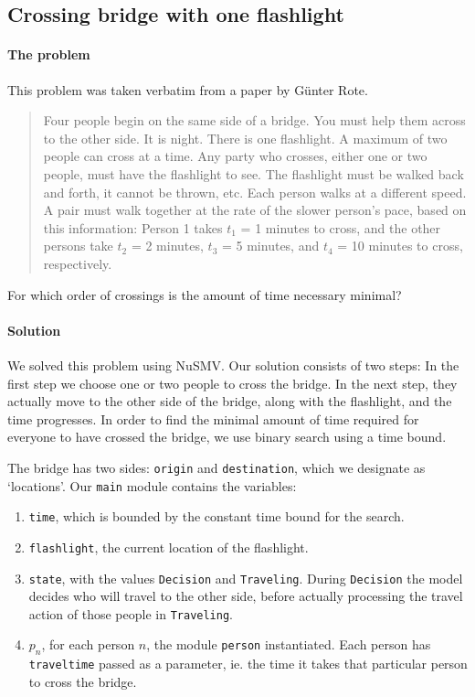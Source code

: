\documentclass[12pt]{article}
\begin{document}
\subsection*{Crossing bridge with one flashlight}
\paragraph{The problem}

This problem was taken verbatim from a paper by G\"unter Rote. \cite{rote2002crossing}

\begin{quotation}
Four people begin on the same side of a bridge.
You must help them across to the other side.
It is night.
There is one flashlight.
A maximum of two people can cross at a time.
Any party who crosses, either one or two people, must have the flashlight to see.
The flashlight must be walked back and forth, it cannot be thrown, etc.
Each person walks at a different speed.
A pair must walk together at the rate of the slower person's pace, based on this information:
Person 1 takes $t_1$ = 1 minutes to cross, and the other persons take $t_2$ = 2
minutes, $t_3$ = 5 minutes, and $t_4$ = 10 minutes to cross, respectively.
\end{quotation}

For which order of crossings is the amount of time necessary minimal?

\paragraph{Solution}
We solved this problem using NuSMV.
Our solution consists of two steps:
In the first step we choose one or two people to cross the bridge.
In the next step, they actually move to the other side of the bridge, along with the flashlight, and the time progresses.
In order to find the minimal amount of time required for everyone to have crossed the bridge, we use binary search using a time bound.

The bridge has two sides: \texttt{origin} and \texttt{destination}, which we designate as `locations'.
Our \texttt{main} module contains the variables:
\begin{enumerate}
\item \texttt{time}, which is bounded by the constant time bound for the search.
\item \texttt{flashlight}, the current location of the flashlight.
\item \texttt{state}, with the values \texttt{Decision} and \texttt{Traveling}. During \texttt{Decision} the model decides who will travel to the other side, before actually processing the travel action of those people in \texttt{Traveling}.
\item $p_n$, for each person $n$, the module \texttt{person} instantiated.
    Each person has \texttt{traveltime} passed as a parameter, ie. the time it takes that particular person to cross the bridge.
\end{enumerate}
\end{document}
